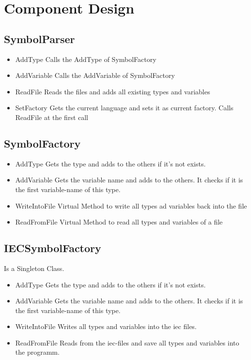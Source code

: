 	
\section{Component Design}
\subsection{SymbolParser}
\begin{itemize}
	\item AddType
	\subitem Calls the AddType of SymbolFactory
	\item AddVariable
	\subitem Calls the AddVariable of SymbolFactory
	\item ReadFile
	\subitem Reads the files and adds all existing types and variables
	\item SetFactory
	 \subitem Gets the current language and sets it as current factory. Calls ReadFile at the first call
\end{itemize}

\subsection{SymbolFactory}
\begin{itemize}
	\item AddType
	\subitem Gets the type and adds to the others if it's not exists.
	\item AddVariable
	\subitem Gets the variable name and adds to the others. It checks if it is the first variable-name of this type.
	\item WriteIntoFile
	\subitem Virtual Method to write all types ad variables back into the file
	\item ReadFromFile
	 \subitem Virtual Method to read all types and variables of a file
\end{itemize}

\subsection{IECSymbolFactory}
Is a Singleton Class.
\begin{itemize}
	\item AddType
	\subitem Gets the type and adds to the others if it's not exists.
	\item AddVariable
	\subitem Gets the variable name and adds to the others. It checks if it is the first variable-name of this type.
	\item WriteIntoFile
	\subitem Writes all types and variables into the iec files.
	\item ReadFromFile
	 \subitem Reads from the iec-files and save all types and variables into the programm.
\end{itemize}

